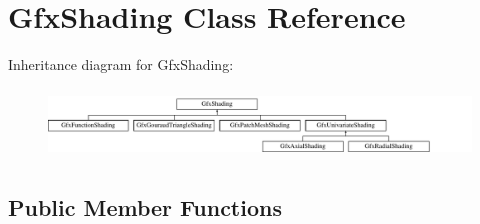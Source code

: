 \hypertarget{class_gfx_shading}{}\section{Gfx\+Shading Class Reference}
\label{class_gfx_shading}
Inheritance diagram for Gfx\+Shading\+:\begin{figure}[H]
\begin{center}
\leavevmode
\includegraphics[height=1.866667cm]{class_gfx_shading}
\end{center}
\end{figure}
\subsection*{Public Member Functions}
